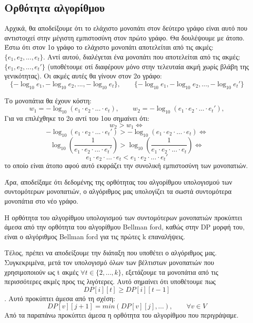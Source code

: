 \documentclass[a4paper,oneside, 11pt]{article}
\begin{document}
\subsection{Ορθότητα αλγορίθμου}
Αρχικά, θα αποδείξουμε ότι το ελάχιστο μονοπάτι στον δεύτερο γράφο είναι αυτό που αντιστοιχεί στην μέγιστη εμπιστοσύνη στον πρώτο γράφο. Θα δουλέψουμε με άτοπο. Έστω ότι στον 1ο γράφο το ελάχιστο μονοπάτι αποτελείται από τις ακμές: $\{e_1, e_2, ..., e_t\}$. Αντί αυτού, διαλέγεται ένα μονοπάτι που αποτελείται από τις ακμές: $\{e_1, e_2, ..., e_t'\}$ (υποθέτουμε οτί διαφέρουν μόνο στην τελευταία ακμή χωρίς βλάβη της γενικότητας). Οι ακμές αυτές θα γίνουν στον 2ο γράφο: 
$$
\{-\log_{10}e_1, -\log_{10}e_2, ..., -\log_{10}{e_t} \}, \qquad \{-\log_{10}e_1, -\log_{10}e_2, ..., -\log_{10}{e_t'} \}
$$

Το μονοπάτια θα έχουν κόστη:
$$
w_1 = -\log_{10} \left(e_1 \cdot e_2 \cdot ... \cdot e_t\right), \qquad w_2 = -\log_{10} \left(e_1 \cdot e_2 \cdot ... \cdot e_t'\right),
$$
Για να επιλέχθηκε το 2ο αντί του 1ου σημαίνει ότι:
$$
w_2 > w_1 \iff 
$$
$$-\log_{10} \left(e_1 \cdot e_2 \cdot ... \cdot e_t'\right) > -\log_{10} \left(e_1 \cdot e_2 \cdot ... \cdot e_t\right) \iff
$$
$$
\log_{10}\left( \frac{1}{e_1 \cdot e_2 \cdot ... \cdot e_t'} \right) > \log_{10}\left( \frac{1}{e_1 \cdot e_2 \cdot ... \cdot e_t} \right) \iff 
$$
$$
e_1 \cdot e_2 \cdot ... \cdot e_t < e_1 \cdot e_2 \cdot ... \cdot e_t'
$$
το οποίο είναι άτοπο αφού αυτό εκφράζει την συνολική εμπιστοσύνη των μονοπατιών. \bigbreak 

Άρα, αποδείξαμε ότι δεδομένης της ορθότητας του αλγορίθμου υπολογισμού των συντομότερων μονοπατιών, ο αλγόριθμος μας υπολογίζει τα σωστά συντομότερα μονοπάτια στο νέο γράφο. \bigbreak 

Η ορθότητα του αλγορίθμου υπολογισμού των συντομότερων μονοπατιών προκύπτει άμεσα από την ορθότητα του αλγορίθμου Bellman ford, καθώς στην DP μορφή του, είναι ο αλγόριθμος Bellman ford για τις πρώτες k επαναλήψεις. \bigbreak 



Τέλος, πρέπει να αποδείξουμε την διάταξη που υποθέτει ο αλγόριθμος μας. Συγκεκριμένα, μετά τον υπολογισμό όλων των βέλτιστων μονοπατιών που χρησιμοποιούν ως t ακμές $\forall t \in \{2, ..., k\}$, εξετάζουμε τα μονοπάτια από τις περισσότερες ακμές προς τις λιγότερες. Αυτό σημαίνει ότι υποθέτουμε πως $$DP[i][t] \geq DP[i][t-1]$$. Αυτό προκύπτει άμεσα από τη σχέση: $$DP[v][j+1] = min(DP[v][j], ...), \qquad \forall v \in V$$ \bigbreak 
Από τα παραπάνω προκύπτει άμεσα η ορθότητα του αλγορίθμου που περιγράψαμε.
\end{document}
